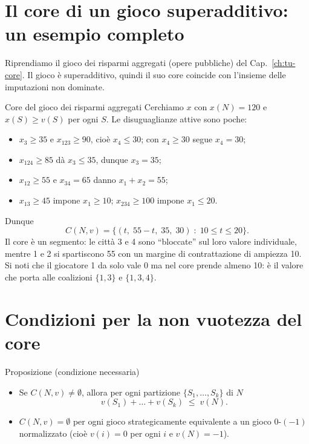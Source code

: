 \documentclass[12pt,a4paper,twoside]{book}
\theoremstyle{plain}
\theoremstyle{definition}
\begin{document}
\section{Il core di un gioco superadditivo: un esempio completo}

Riprendiamo il gioco dei risparmi aggregati (opere pubbliche) del
Cap.~\ref{ch:tu-core}. Il gioco è superadditivo, quindi il suo core coincide con
l'insieme delle imputazioni non dominate.

\begin{exbox}{Core del gioco dei risparmi aggregati}
Cerchiamo $x$ con $x(N)=120$ e $x(S)\ge v(S)$ per ogni $S$. Le disuguaglianze
attive sono poche:
\begin{itemize}
  \item $x_3\ge 35$ e $x_{123}\ge 90$, cioè $x_4\le 30$; con $x_4\ge 30$ segue $x_4=30$;
  \item $x_{124}\ge 85$ dà $x_3\le 35$, dunque $x_3=35$;
  \item $x_{12}\ge 55$ e $x_{34}=65$ danno $x_1+x_2=55$;
  \item $x_{13}\ge 45$ impone $x_1\ge 10$; $x_{234}\ge 100$ impone $x_1\le 20$.
\end{itemize}
Dunque
\[
  C(N,v)=\{(t,\;55-t,\;35,\;30)\;:\;10\le t\le 20\}.
\]
Il core è un segmento: le città 3 e 4 sono ``bloccate'' sul loro valore
individuale, mentre 1 e 2 si spartiscono 55 con un margine di contrattazione di
ampiezza 10. Si noti che il giocatore 1 da solo vale $0$ ma nel core prende
almeno 10: è il valore che porta alle coalizioni $\{1,3\}$ e $\{1,3,4\}$.
\end{exbox}

\section{Condizioni per la non vuotezza del core}

\begin{thmbox}{Proposizione (condizione necessaria)}
\begin{itemize}
  \item[(i)] Se $C(N,v)\ne\emptyset$, allora per ogni partizione $\{S_1,\dots,S_k\}$ di $N$
  \[
    v(S_1)+\dots+v(S_k)\;\le\;v(N). \tag{$*$}
  \]
  \item[(ii)] $C(N,v)=\emptyset$ per ogni gioco strategicamente equivalente a un
  gioco $0$-$(-1)$ normalizzato (cioè $v(i)=0$ per ogni $i$ e $v(N)=-1$).
\end{itemize}
\end{thmbox}
\end{document}
